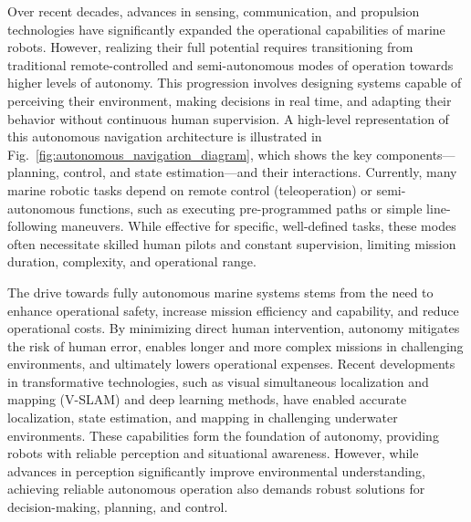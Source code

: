 Over recent decades, advances in sensing, communication, and propulsion technologies have significantly expanded the operational capabilities of marine robots. However, realizing their full potential requires transitioning from traditional remote-controlled and semi-autonomous modes of operation towards higher levels of autonomy. This progression involves designing systems capable of perceiving their environment, making decisions in real time, and adapting their behavior without continuous human supervision. A high-level representation of this autonomous navigation architecture is illustrated in Fig.~\ref{fig:autonomous_navigation_diagram}, which shows the key components—planning, control, and state estimation—and their interactions. Currently, many marine robotic tasks depend on remote control (teleoperation) or semi-autonomous functions, such as executing pre-programmed paths or simple line-following maneuvers. While effective for specific, well-defined tasks, these modes often necessitate skilled human pilots and constant supervision, limiting mission duration, complexity, and operational range.

The drive towards fully autonomous marine systems stems from the need to enhance operational safety, increase mission efficiency and capability, and reduce operational costs. By minimizing direct human intervention, autonomy mitigates the risk of human error, enables longer and more complex missions in challenging environments, and ultimately lowers operational expenses. Recent developments in transformative technologies, such as visual simultaneous localization and mapping (V-SLAM)\cite{olaya_survey} and deep learning methods\cite{singh2025deepvl}, have enabled accurate localization, state estimation, and mapping in challenging underwater environments. These capabilities form the foundation of autonomy, providing robots with reliable perception and situational awareness. However, while advances in perception significantly improve environmental understanding, achieving reliable autonomous operation also demands robust solutions for decision-making, planning, and control.

